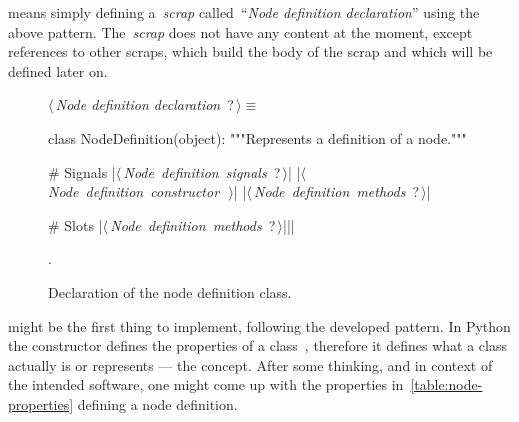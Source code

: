 \documentclass[%
    a4paper,    %
    justified,  %
    nobib,      %
    openany     %
]{tufte-book}
\begin{document}
\newpage{}

 means simply defining a~\emph{scrap}
called~\enquote{\emph{Node definition declaration}} using the above pattern.
The~\emph{scrap} does not have any content at the moment, except references to
other scraps, which build the body of the scrap and which will be defined later
on.

\begin{figure}[h]
  \begin{flushleft} \small
\begin{minipage}{\linewidth}\label{scrap1}\raggedright\small
{} $\langle\,${\itshape Node definition declaration}\nobreak\ {\footnotesize {?}}$\,\rangle\equiv$
\vspace{-1ex}
\begin{pythoncode}
class NodeDefinition(object):
    """Represents a definition of a node."""

    # Signals
    |\hbox{$\langle\,${\itshape Node definition signals}\nobreak\ {\footnotesize ?}$\,\rangle$}|
    |\hbox{$\langle\,${\itshape Node definition constructor}\nobreak\ {\footnotesize {}}$\,\rangle$}|
    |\hbox{$\langle\,${\itshape Node definition methods}\nobreak\ {\footnotesize ?}$\,\rangle$}|

    # Slots
    |\hbox{$\langle\,${\itshape Node definition methods}\nobreak\ {\footnotesize ?}$\,\rangle$}||\NWsep|
\end{pythoncode}
\vspace{1.5ex}
\footnotesize
\begin{list}{}{\setlength{\itemsep}{-\parsep}\setlength{\itemindent}{-\leftmargin}}
\item {\NWtxtMacroNoRef}.

\item{}
\end{list}
\end{minipage}\vspace{4ex}
\end{flushleft}
\caption{Declaration of the node definition class.}
  \label{lst:node-def-class-decl}
\end{figure}

 might be the first thing to implement, following
the developed pattern. In Python the constructor defines the properties of a
class~, therefore it defines what a class
actually is or represents --- the concept. After some thinking, and in context
of the intended software, one might come up with the properties
in~\autoref{table:node-properties} defining a node definition.
\end{document}
